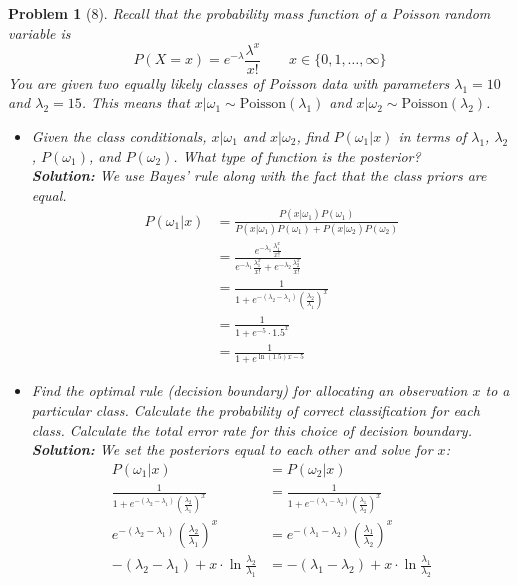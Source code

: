 \documentclass[11pt]{article}
\theoremstyle{quest}
\newtheorem*{question}{Problem}
\begin{document}
\begin{question}[8]
Recall that the probability mass function of a Poisson random variable is
\begin{equation*}
P(X=x)=e^{-\lambda} \frac{\lambda^x}{x!} \quad\quad x \in \{0,1,\dotsc,\infty\}
\end{equation*}
You are given two \textit{equally likely} classes of Poisson data with parameters $\lambda_1 = 10$ and $\lambda_2 = 15$. This means that $x|\omega_1 \sim \mathrm{Poisson}(\lambda_1)$ and $x|\omega_2 \sim \mathrm{Poisson}(\lambda_2)$.
\begin{itemize}
\item[(a)] Given the class conditionals, $x|\omega_1$ and $x|\omega_2$, find $P(\omega_1|x)$ in terms of $\lambda_1$, $\lambda_2$, $P(\omega_1)$, and $P(\omega_2)$. What type of function is the posterior? \\
\textbf{Solution:}
We use Bayes' rule along with the fact that the class priors are equal.
\begin{align*}
P(\omega_1|x) &= \frac{P(x|\omega_1)P(\omega_1)}{P(x|\omega_1)P(\omega_1)+P(x|\omega_2)P(\omega_2)}\\
&= \frac{e^{-\lambda_1}\frac{\lambda_1^x}{x!}}{e^{-\lambda_1}\frac{\lambda_1^x}{x!}+e^{-\lambda_2}\frac{\lambda_2^x}{x!}}\\
&= \frac1{1+e^{-(\lambda_2-\lambda_1)}(\frac{\lambda_2}{\lambda_1})^x}\\
&= \frac1{1+e^{-5}\cdot 1.5^x}\\
&= \frac1{1+e^{\ln(1.5)x-5}}
\end{align*}
\item[(b)] Find the optimal rule (decision boundary) for allocating an observation $x$ to a particular class. Calculate the probability of correct classification for each class. Calculate the total error rate for this choice of decision boundary. \\
\textbf{Solution:}
We set the posteriors equal to each other and solve for $x$: \begin{align*}
P(\omega_1|x) &= P(\omega_2|x)\\
\frac1{1+e^{-(\lambda_2-\lambda_1)}(\frac{\lambda_2}{\lambda_1})^x} &= \frac1{1+e^{-(\lambda_1-\lambda_2)}(\frac{\lambda_1}{\lambda_2})^x}\\
e^{-(\lambda_2-\lambda_1)}(\frac{\lambda_2}{\lambda_1})^x &= e^{-(\lambda_1-\lambda_2)}(\frac{\lambda_1}{\lambda_2})^x\\
-(\lambda_2-\lambda_1)+x\cdot\ln{\frac{\lambda_2}{\lambda_1}} &= -(\lambda_1-\lambda_2)+x\cdot\ln{\frac{\lambda_1}{\lambda_2}}\\

\end{align*}
\end{itemize}
\end{question}
\end{document}
